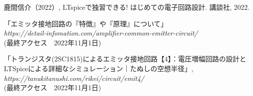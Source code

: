 \documentclass[10pt,a4j,dvipdfmx]{jarticle}
\begin{document}
\setlength{\abovedisplayskip}{1.5pt} 
\setlength{\belowdisplayskip}{0pt}
\pagestyle{fancy}
\setlength{\headheight}{5truemm}





\newpage
\pagestyle{plain}

\begin{thebibliography}{3}
\setlength{\parskip}{0cm} %
\setlength{\itemsep}{0cm}

鹿間信介（2022）, 
LTspiceで独習できる! はじめての電子回路設計. 
講談社, 2022.

「エミッタ接地回路の『特徴』や『原理』について」\\{\it https://detail-infomation.com/amplifier-common-emitter-circuit/}\\
(最終アクセス　2022年11月1日)


「トランジスタ(2SC1815)によるエミッタ接地回路【4】：電圧増幅回路の設計とLTSpiceによる詳細なシミュレーション｜たぬしの空想半径」, {\it https://tanukitanushi.com/rikei/circuit/emit4/}\\
(最終アクセス　2022年11月1日)
\end{thebibliography}
\end{document}
